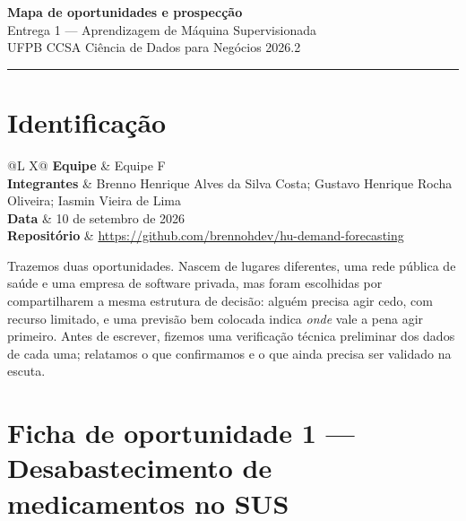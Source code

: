 \documentclass[11pt,a4paper]{article}
\newcommand{\campo}[2]{\textbf{#1} & #2 \\ \addlinespace[1pt]}
\begin{document}
\begin{center}
    {\LARGE\bfseries\color{azulmls} Mapa de oportunidades e prospecção}\\[3pt]
    {\large Entrega 1 --- Aprendizagem de Máquina Supervisionada}\\[2pt]
    {\normalsize UFPB \textperiodcentered{} CCSA \textperiodcentered{} Ciência de Dados para Negócios \textperiodcentered{} 2026.2}
\end{center}

\vspace{4pt}
\hrule
\vspace{6pt}

\section{Identificação}

\begin{tabularx}{\textwidth}{@{}L X@{}}
\campo{Equipe}{Equipe F}
\campo{Integrantes}{Brenno Henrique Alves da Silva Costa; Gustavo Henrique Rocha Oliveira; Iasmin Vieira de Lima}
\campo{Data}{10 de setembro de 2026}
\campo{Repositório}{\url{https://github.com/brennohdev/hu-demand-forecasting}}
\end{tabularx}

Trazemos duas oportunidades. Nascem de lugares diferentes, uma rede pública de saúde e uma empresa de software privada, mas foram escolhidas por compartilharem a mesma estrutura de decisão: alguém precisa agir cedo, com recurso limitado, e uma previsão bem colocada indica \emph{onde} vale a pena agir primeiro. Antes de escrever, fizemos uma verificação técnica preliminar dos dados de cada uma; relatamos o que confirmamos e o que ainda precisa ser validado na escuta.

\section{Ficha de oportunidade 1 --- Desabastecimento de medicamentos no SUS}
\end{document}
